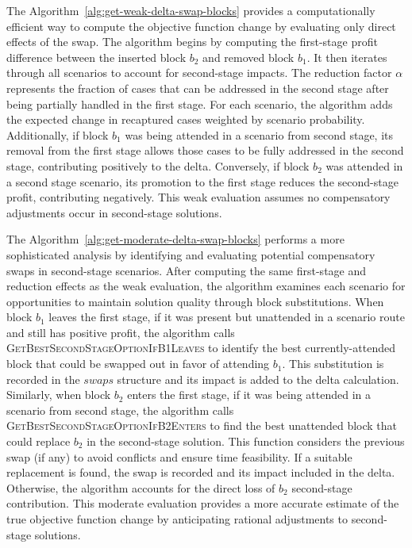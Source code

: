 The Algorithm~\ref{alg:get-weak-delta-swap-blocks} provides a computationally efficient way to compute the objective function change by evaluating only direct effects of the swap. The algorithm begins by computing the first-stage profit difference between the inserted block $b_2$ and removed block $b_1$.
It then iterates through all scenarios to account for second-stage impacts. The reduction factor $\alpha$ represents the fraction of cases that can be addressed in the second stage after being partially handled in the first stage. For each scenario, the algorithm adds the expected change in recaptured cases weighted by scenario probability. Additionally, if block $b_1$ was being attended in a scenario from second stage, its removal from the first stage allows those cases to be fully addressed in the second stage, contributing positively to the delta. Conversely, if block $b_2$ was attended in a second stage scenario, its promotion to the first stage reduces the second-stage profit, contributing negatively. This weak evaluation assumes no compensatory adjustments occur in second-stage solutions.

The Algorithm~\ref{alg:get-moderate-delta-swap-blocks} performs a more sophisticated analysis by identifying and evaluating potential compensatory swaps in second-stage scenarios. After computing the same first-stage and reduction effects as the weak evaluation, the algorithm examines each scenario for opportunities to maintain solution quality through block substitutions. When block $b_1$ leaves the first stage, if it was present but unattended in a scenario route and still has positive profit, the algorithm calls \textsc{GetBestSecondStageOptionIfB1Leaves} to identify the best currently-attended block that could be swapped out in favor of attending $b_1$. This substitution is recorded in the $swaps$ structure and its impact is added to the delta calculation. Similarly, when block $b_2$ enters the first stage, if it was being attended in a scenario from second stage, the algorithm calls \textsc{GetBestSecondStageOptionIfB2Enters} to find the best unattended block that could replace $b_2$ in the second-stage solution. This function considers the previous swap (if any) to avoid conflicts and ensure time feasibility. If a suitable replacement is found, the swap is recorded and its impact included in the delta. Otherwise, the algorithm accounts for the direct loss of $b_2$ second-stage contribution. This moderate evaluation provides a more accurate estimate of the true objective function change by anticipating rational adjustments to second-stage solutions.

